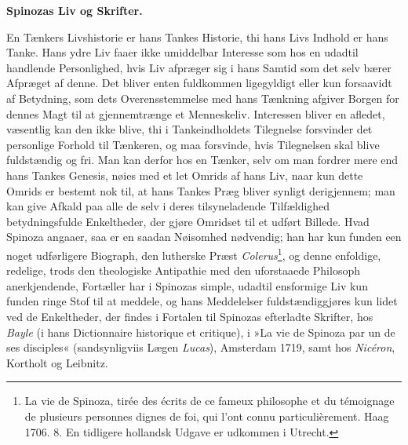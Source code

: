 \documentclass[12pt,a4paper]{book}
\newcommand{\opage}[1]{\marginnote{\footnotesize\textit{[#1]}}}
\begin{document}
\begin{center}
\textbf{Spinozas Liv og Skrifter.}
\end{center}

\opage{27} \setcounter{footnote}{0}%
En Tænkers Livshistorie er hans Tankes Historie, thi hans Livs Indhold er
hans Tanke. Hans ydre Liv faaer ikke umiddelbar Interesse som hos en
udadtil handlende Personlighed, hvis Liv afpræger sig i hans Samtid som
det selv bærer Afpræget af denne. Det bliver enten fuldkommen ligegyldigt
eller kun forsaavidt af Betydning, som dets Overensstemmelse med hans
Tænkning afgiver Borgen for dennes Magt til at gjennemtrænge et
Menneskeliv. Interessen bliver en afledet, væsentlig kan den ikke blive,
thi i Tankeindholdets Tilegnelse forsvinder det personlige Forhold til
Tænkeren, og maa forsvinde, hvis Tilegnelsen skal blive fuldstændig og
fri. Man kan derfor hos en Tænker, selv om man fordrer mere end hans
Tankes Genesis, nøies med et let Omrids af hans Liv, naar kun dette Omrids
er bestemt nok til, at hans Tankes Præg bliver synligt derigjennem; man
kan give Afkald paa alle de selv i deres tilsyneladende Tilfældighed
betydningsfulde Enkeltheder, der gjøre Omridset til et udført Billede.
Hvad Spinoza angaaer, saa er en saadan Nøisomhed nødvendig; han har kun
funden een noget udførligere Biograph, den lutherske Præst
\emph{Colerus}\footnote{La vie de Spinoza, tirée des écrits de ce fameux
philosophe et du témoignage de plusieurs personnes dignes de foi, qui
l'ont connu particulièrement. Haag 1706. 8. En tidligere hollandsk Udgave
er udkommen i Utrecht.},
\opage{28} og denne enfoldige, redelige, trods den theologiske Antipathie med den
uforstaaede Philosoph anerkjendende, Fortæller har i Spinozas simple,
udadtil ensformige Liv kun funden ringe Stof til at meddele, og hans
Meddelelser fuldstændiggjøres kun lidet ved de Enkeltheder, der findes i
Fortalen til Spinozas efterladte Skrifter, hos \emph{Bayle} (i hans
Dictionnaire historique et critique), i »La vie de Spinoza par un de ses
disciples« (sandsynligviis Lægen \emph{Lucas}), Amsterdam 1719, samt hos
\emph{Nicéron}, Kortholt og Leibnitz.
\end{document}
